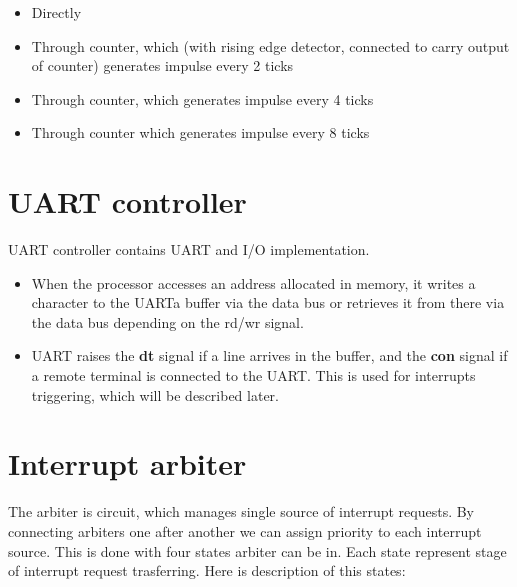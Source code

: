 \begin{itemize}
	\item Directly 
	\item Through counter, which (with rising edge detector, connected to carry output of counter) generates impulse every 2 ticks
	\item Through counter, which generates impulse every 4 ticks
	\item Through counter which generates impulse every 8 ticks
\end{itemize}

\section*{UART controller}

UART controller contains UART and I/O implementation.

\begin{itemize}
	\item When the processor accesses an address allocated in memory, it writes a character to the UARTa buffer via the data bus or retrieves it from there via the data bus depending on the rd/wr signal.
	\item UART raises the \textbf{dt} signal if a line arrives in the buffer, and the \textbf{con} signal if a remote terminal is connected to the UART. This is used for interrupts triggering, which will be described later.
\end{itemize}

\section*{Interrupt arbiter}

The arbiter is circuit, which manages single source of interrupt requests. By connecting arbiters one after another we can assign priority to each interrupt source. This is done with four states arbiter can be in. Each state represent stage of interrupt request trasferring. Here is description of this states:

